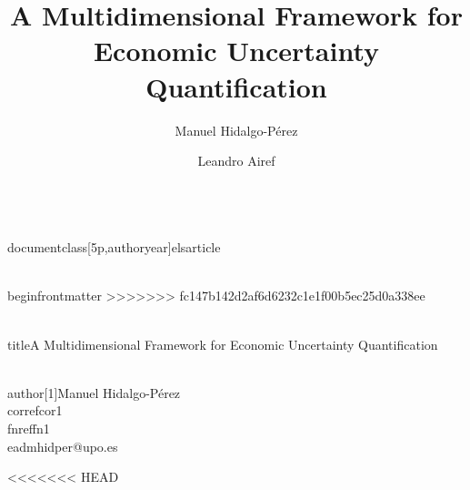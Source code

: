 \\documentclass[5p,authoryear]{elsarticle}
\begin{document}
\\begin{frontmatter}
>>>>>>> fc147b142d2af6d6232c1e1f00b5ec25d0a338ee

\\title{A Multidimensional Framework for Economic Uncertainty Quantification}    

\\author[1]{Manuel Hidalgo-Pérez\\corref{cor1}%
 \\fnref{fn1}}
\\ead{mhidper@upo.es} 

<<<<<<< HEAD
\title{A Multidimensional Framework for Economic Uncertainty Quantification}    

\author[1]{Manuel Hidalgo-Pérez%
 }

\author[2]{Leandro Airef}

\end{document}
